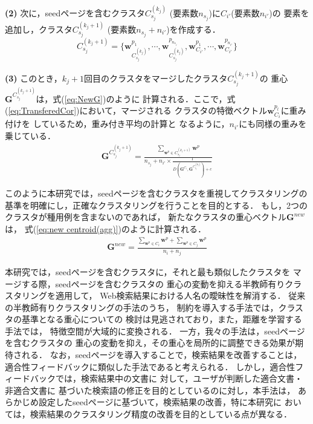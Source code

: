\documentclass[japanese]{jnlp_1.4}
\begin{document}
\noindent
\textbf{(2)} 次に，seedページを含むクラスタ$C_{s_{j}}^{(k_{j})}$
(要素数$n_{s_{j}}$)に$C_{i'}$(要素数$n_{i'}$)の
要素を追加し，クラスタ$C_{s_{j}}^{(k_{j}+1)}$
(要素数$n_{s_{j}}+n_{i'}$)を作成する．
\[
C_{s_{j}}^{(k_{j}+1)}=
\{
\boldsymbol{w}^{p_{1}}_{C_{s_{j}}^{(k_{j})}},\cdots
,\boldsymbol{w}^{p_{{n}_{s_{j}}}}_{C_{s_{j}}^{(k_{j})}},
\boldsymbol{w}^{p_{1}}_{C_{i'}},\cdots ,\boldsymbol{w}^{p_{n_{{i'}}}}_{C_{i'}} \}
\]


\noindent
\textbf{(3)} このとき，$k_{j}+1$回目のクラスタをマージしたクラスタ$C_{s_{j}}^{(k_{j}+1)}$の
重心$\boldsymbol{G}^{C_{s_{j}}^{(k_{j}+1)}}$は，式(\ref{eq:NewG})のように
計算される．ここで，式(\ref{eq:TransferedCor})において，マージされる
クラスタの特徴ベクトル$\boldsymbol{w}^{p_{l}}_{C_{i}}$に重み付けを
しているため，重み付き平均の計算と
なるように，$n_{i'}$にも同様の重みを乗じている．
\begin{eqnarray}
\boldsymbol{G}^{C_{s_{j}}^{(k_{j}+1)}}=\frac{\sum_{\boldsymbol{w}^{p}\in C_{s_{j}}^{(k_{j}+1)}}\boldsymbol{w}^{p}}{n_{{s_{j}}}+n_{i'}\times\frac{1}{D(\boldsymbol{G}^{C_{i}},\boldsymbol{G}^{C_{s_{j}}^{(k_{j})}})+c}}
\label{eq:NewG}
\end{eqnarray}

このように本研究では，seedページを含むクラスタを重視してクラスタリングの
基準を明確にし，正確なクラスタリングを行うことを目的とする．
もし，2つのクラスタが種用例を含まないのであれば，
新たなクラスタの重心ベクトル$\boldsymbol{G}^{new}$は，
式(\ref{eq:new centroid(agg)})のように計算される．
\begin{eqnarray}
 \boldsymbol{G}^{new}=\frac{\sum_{\boldsymbol{w}^{p}\in C_{i}}\boldsymbol{w}^{p}+\sum_{\boldsymbol{w}^{p}\in C_{j}}\boldsymbol{w}^{p}}{n_{i}+n_{j}}
 \label{eq:new centroid(agg)}
\end{eqnarray}

本研究では，seedページを含むクラスタに，それと最も類似したクラスタを
マージする際，seedページを含むクラスタの
重心の変動を抑える半教師有りクラスタリングを適用して，
Web検索結果における人名の曖昧性を解消する．
従来の半教師有りクラスタリングの手法のうち，
制約を導入する手法では，クラスタの基準となる重心についての
検討は見逃されており，また，距離を学習する手法では，
特徴空間が大域的に変換される．
一方，我々の手法は，seedページを含むクラスタの
重心の変動を抑え，その重心を局所的に調整できる効果が期待される．
なお，seedページを導入することで，検索結果を改善することは，
適合性フィードバック\cite{Rocchio71}に類似した手法であると考えられる．
しかし，適合性フィードバックでは，検索結果中の文書に
対して，ユーザが判断した適合文書・非適合文書に
基づいた検索語の修正を目的としているのに対し，本手法は，
あらかじめ設定したseedページに基づいて，検索結果の改善，特に本研究に
おいては，検索結果のクラスタリング精度の改善を目的としている点が異なる．
\end{document}

